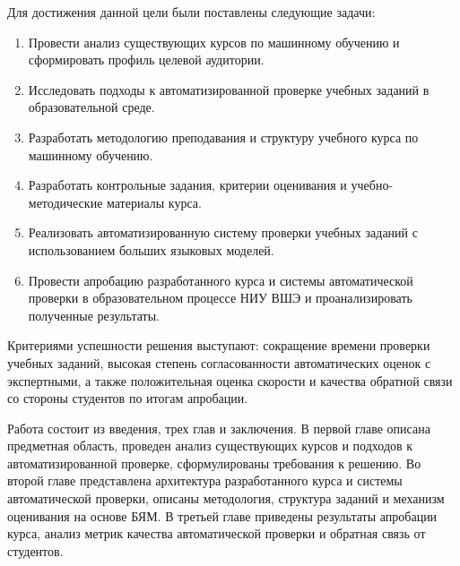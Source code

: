 Для достижения данной цели были поставлены следующие задачи:
\begin{enumerate}
  \item Провести анализ существующих курсов по машинному обучению и сформировать профиль целевой аудитории.
  \item Исследовать подходы к автоматизированной проверке учебных заданий в образовательной среде.
  \item Разработать методологию преподавания и структуру учебного курса по машинному обучению.
  \item Разработать контрольные задания, критерии оценивания и учебно-методические материалы курса.
  \item Реализовать автоматизированную систему проверки учебных заданий с использованием больших языковых моделей.
  \item Провести апробацию разработанного курса и системы автоматической проверки в образовательном процессе НИУ ВШЭ и проанализировать полученные результаты.
\end{enumerate}

Критериями успешности решения выступают: сокращение времени проверки учебных заданий, высокая степень согласованности автоматических оценок с экспертными, а также положительная оценка скорости и качества обратной связи со стороны студентов по итогам апробации.

Работа состоит из введения, трех глав и заключения. В первой главе описана предметная область, проведен анализ существующих курсов и подходов к автоматизированной проверке, сформулированы требования к решению. Во второй главе представлена архитектура разработанного курса и системы автоматической проверки, описаны методология, структура заданий и механизм оценивания на основе БЯМ. В третьей главе приведены результаты апробации курса, анализ метрик качества автоматической проверки и обратная связь от студентов.
